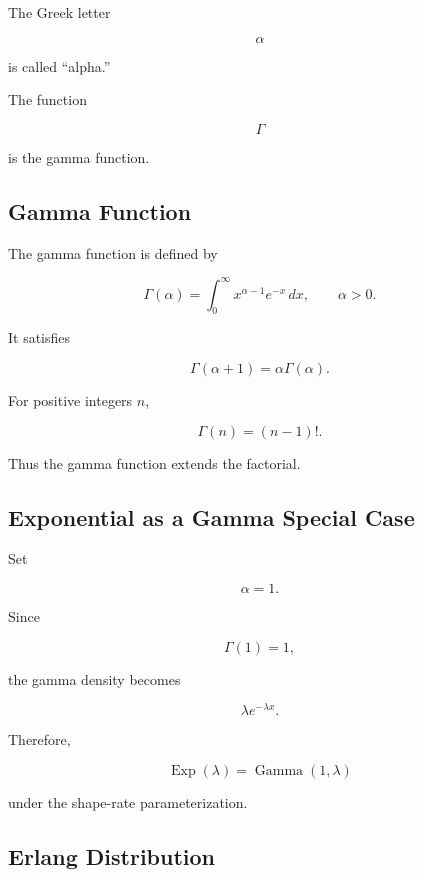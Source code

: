 The Greek letter

\[
\alpha
\]

is called ``alpha.''

The function

\[
\Gamma
\]

is the gamma function.

\subsection{Gamma Function}
\label{subsec:gamma-function-probability}

The gamma function is defined by

\[
\boxed{
\Gamma(\alpha)
=
\int_0^\infty
x^{\alpha-1}e^{-x}\,dx,
\qquad
\alpha>0.
}
\]

It satisfies

\[
\boxed{
\Gamma(\alpha+1)
=
\alpha\Gamma(\alpha).
}
\]

For positive integers \(n\),

\[
\boxed{
\Gamma(n)
=
(n-1)!.
}
\]

Thus the gamma function extends the factorial.

\subsection{Exponential as a Gamma Special Case}
\label{subsec:exponential-gamma-special-case}

Set

\[
\alpha=1.
\]

Since

\[
\Gamma(1)=1,
\]

the gamma density becomes

\[
\lambda e^{-\lambda x}.
\]

Therefore,

\[
\boxed{
\operatorname{Exp}(\lambda)
=
\operatorname{Gamma}(1,\lambda)
}
\]

under the shape-rate parameterization.

\subsection{Erlang Distribution}
\label{subsec:erlang-distribution}

